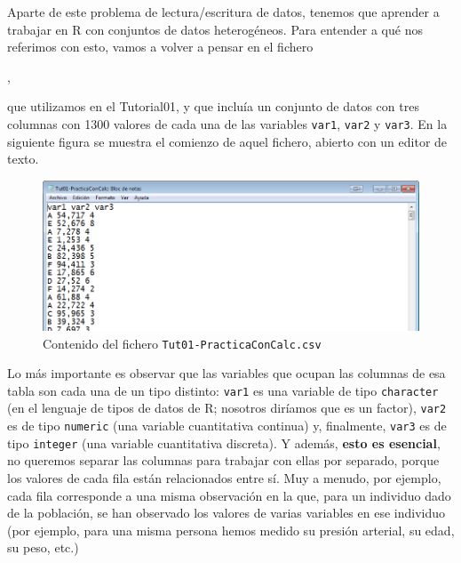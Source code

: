 \documentclass[10pt,a4paper]{article}\usepackage[]{graphicx}\usepackage[]{color}
\newcounter {cont01}
\begin{document}
Aparte de este problema de lectura/escritura de datos, tenemos que aprender a trabajar en R con conjuntos de datos heterogéneos. Para entender a qué nos referimos con esto, vamos a volver a pensar en el fichero
\begin{center}
,
\end{center}
que utilizamos en el Tutorial01, y que incluía un {\sf conjunto de datos} con tres columnas con 1300 valores de cada una de las variables {\tt var1}, {\tt var2} y {\tt var3}. En la siguiente figura se muestra el comienzo de aquel fichero, abierto con un editor de texto.
    \begin{figure}[h!]	
    \begin{center}
	\includegraphics[width=12cm]{../fig/Tut04-08.png}
    \end{center}
	\caption{Contenido del fichero {\tt Tut01-PracticaConCalc.csv}}
    \label{Cap03:fig:FicheroTut01-PracticaConCalc}
    \end{figure}
Lo más importante es observar que las variables que ocupan las columnas de esa tabla son cada una de un tipo distinto: {\tt var1} es una variable de tipo {\tt character} (en el lenguaje de tipos de datos de R; nosotros diríamos que es un factor), {\tt var2} es de tipo {\tt numeric} (una variable cuantitativa continua) y, finalmente, {\tt var3} es de tipo {\tt integer} (una variable cuantitativa discreta). Y además, {\bf esto es esencial}, no queremos separar las columnas para trabajar con ellas por separado, porque los valores de cada fila están relacionados entre sí. Muy a menudo, por ejemplo, cada fila corresponde a una misma observación en la que, para un individuo dado de la población, se han observado los valores de varias variables en ese individuo (por ejemplo, para una misma persona hemos medido su presión arterial, su edad, su peso, etc.)
\end{document}
